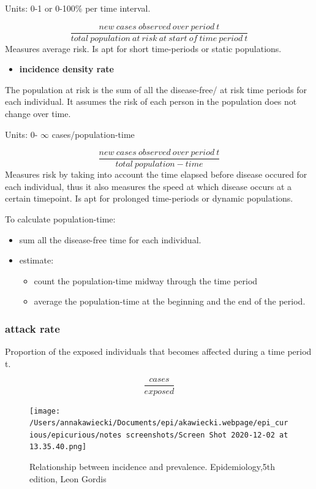 \documentclass[
]{article}
\providecommand{\tightlist}{%
  \setlength{\itemsep}{0pt}\setlength{\parskip}{0pt}}
\begin{document}
Units: 0-1 or 0-100\% per time interval.

\[\frac{new\:cases\:observed\:over\:period\:t}{total\:population\:at\:risk\:at\:start\:of\:time\:period\:t}\]
Measures average risk. Is apt for short time-periods or static
populations.

\begin{itemize}
\tightlist
\item
  \textbf{incidence density rate}
\end{itemize}

The population at risk is the sum of all the disease-free/ at risk time
periods for each individual. It assumes the risk of each person in the
population does not change over time.

Units: 0- \(\infty\) cases/population-time

\[\frac{new\:cases\:observed\:over\:period\:t}{total\:population-time}\]
Measures risk by taking into account the time elapsed before disease
occured for each individual, thus it also measures the speed at which
disease occurs at a certain timepoint. Is apt for prolonged time-periods
or dynamic populations.

To calculate population-time:

\begin{itemize}
\tightlist
\item
  sum all the disease-free time for each individual.
\item
  estimate:

  \begin{itemize}
  \tightlist
  \item
    count the population-time midway through the time period
  \item
    average the population-time at the beginning and the end of the
    period.
  \end{itemize}
\end{itemize}

\hypertarget{attack-rate}{%
\subsubsection{attack rate}\label{attack-rate}}

Proportion of the exposed individuals that becomes affected during a
time period t.

\[\frac{cases}{exposed}\]

\begin{figure}
\centering
\texttt{[image: /Users/annakawiecki/Documents/epi/akawiecki.webpage/epi\_curious/epicurious/notes screenshots/Screen Shot 2020-12-02 at 13.35.40.png]}
\caption{Relationship between incidence and prevalence. Epidemiology,5th
edition, Leon Gordis}
\end{figure}
\end{document}
